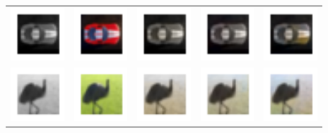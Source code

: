 \documentclass{article}
\begin{document}
\begin{table}[h!]
\begin{tabular}{ccccc}
    \includegraphics[width=2cm]{results3/81-bw.png} & \includegraphics[width=2cm]{results3/81-gt.png} & \includegraphics[width=2cm]{results5/81-relucnn.png} & \includegraphics[width=2cm]{results5/81-tanhcnn.png} & \includegraphics[width=2cm]{results3/81-gan.png} \\
    \includegraphics[width=2cm]{results3/123-bw.png} & \includegraphics[width=2cm]{results3/123-gt.png} & \includegraphics[width=2cm]{results5/123-relucnn.png} & \includegraphics[width=2cm]{results5/123-tanhcnn.png} & \includegraphics[width=2cm]{results3/123-gan.png} \\

\end{tabular}
\end{table}
\end{document}
